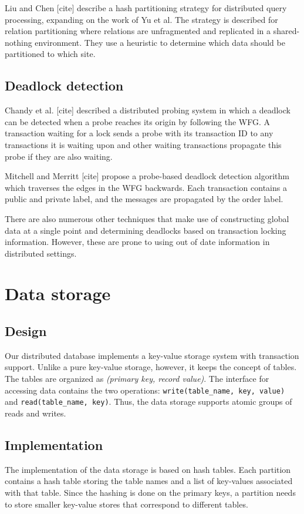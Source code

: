 \documentclass[a4paper, 10pt, notitlepage]{article}
\begin{document}
Liu and Chen [cite] describe a hash partitioning strategy for distributed query processing, expanding on the work of Yu et al. The strategy is described for relation partitioning where relations are unfragmented and replicated in a shared-nothing environment. They use a heuristic to determine which data should be partitioned to which site.

\subsection{Deadlock detection}
Chandy et al. [cite] described a distributed probing system in which a deadlock can be detected when a probe reaches its origin by following the WFG. A transaction waiting for a lock sends a probe with its transaction ID to any transactions it is waiting upon and other waiting transactions propagate this probe if they are also waiting.

Mitchell and Merritt [cite] propose a probe-based deadlock detection algorithm which traverses the edges in the WFG backwards. Each transaction contains a public and private label, and the messages are propagated by the order label.

There are also numerous other techniques that make use of constructing global data at a single point and determining deadlocks based on transaction locking information. However, these are prone to using out of date information in distributed settings.


\section{Data storage}

\subsection{Design}
Our distributed database implements a key-value storage system with transaction support. Unlike a pure key-value storage, however,
it keeps the concept of tables. The tables are organized as {\em (primary key, record value)}.
The interface for accessing data contains the two operations: \texttt{write(table\_name, key, value)} and \texttt{read(table\_name, key)}.
Thus, the data storage supports atomic groups of reads and writes.

\subsection{Implementation}
The implementation of the data storage is based on hash tables. Each partition contains a hash table storing the table names and a list
of key-values associated with that table. Since the hashing is done on the primary keys, a partition needs to store smaller key-value
stores that correspond to different tables. 
\end{document}
